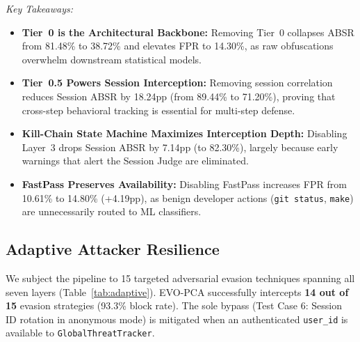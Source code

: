 \documentclass[conference]{IEEEtran}
\begin{document}
\textit{Key Takeaways:}
\begin{itemize}[leftmargin=*]
    \item \textbf{Tier~0 is the Architectural Backbone:} Removing Tier~0 collapses ABSR from 81.48\% to 38.72\% and elevates FPR to 14.30\%, as raw obfuscations overwhelm downstream statistical models.
    \item \textbf{Tier~0.5 Powers Session Interception:} Removing session correlation reduces Session ABSR by 18.24pp (from 89.44\% to 71.20\%), proving that cross-step behavioral tracking is essential for multi-step defense.
    \item \textbf{Kill-Chain State Machine Maximizes Interception Depth:} Disabling Layer~3 drops Session ABSR by 7.14pp (to 82.30\%), largely because early warnings that alert the Session Judge are eliminated.
    \item \textbf{FastPass Preserves Availability:} Disabling FastPass increases FPR from 10.61\% to 14.80\% (+4.19pp), as benign developer actions (\texttt{git status}, \texttt{make}) are unnecessarily routed to ML classifiers.
\end{itemize}

\subsection{Adaptive Attacker Resilience}
We subject the pipeline to 15 targeted adversarial evasion techniques spanning all seven layers (Table~\ref{tab:adaptive}). EVO-PCA successfully intercepts \textbf{14 out of 15} evasion strategies (93.3\% block rate). The sole bypass (Test Case 6: Session ID rotation in anonymous mode) is mitigated when an authenticated \texttt{user\_id} is available to \texttt{GlobalThreatTracker}.
\end{document}
